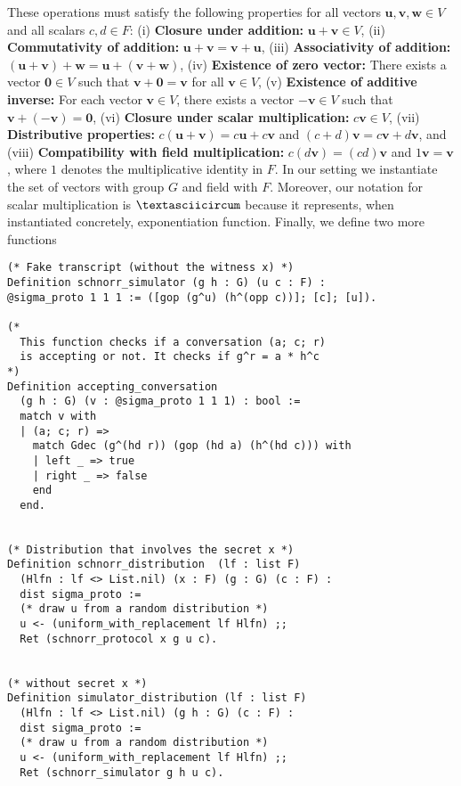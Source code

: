 \documentclass[sigconf]{acmart}
\begin{document}
These operations must satisfy the following properties for all vectors \(\mathbf{u}, \mathbf{v}, \mathbf{w} \in V\) and all scalars \(c, d \in F\):
(i) \textbf{Closure under addition:} \(\mathbf{u} + \mathbf{v} \in V\), (ii) \textbf{Commutativity of addition:} \(\mathbf{u} + \mathbf{v} = \mathbf{v} + \mathbf{u}\), 
(iii)  \textbf{Associativity of addition:} \((\mathbf{u} + \mathbf{v}) + \mathbf{w} = \mathbf{u} + (\mathbf{v} + \mathbf{w})\), 
(iv) \textbf{Existence of zero vector:} There exists a vector \(\mathbf{0} \in V\) such that \(\mathbf{v} + \mathbf{0} = \mathbf{v}\) for all \(\mathbf{v} \in V\), 
(v) \textbf{Existence of additive inverse:} For each vector \(\mathbf{v} \in V\), there exists a vector \(-\mathbf{v} \in V\) such that \(\mathbf{v} + (-\mathbf{v}) = \mathbf{0}\),
(vi) \textbf{Closure under scalar multiplication:} \(c\mathbf{v} \in V\), 
(vii) \textbf{Distributive properties:} \(c(\mathbf{u} + \mathbf{v}) = c\mathbf{u} + c\mathbf{v}\) and \((c + d)\mathbf{v} = c\mathbf{v} + d\mathbf{v}\), 
and (viii) \textbf{Compatibility with field multiplication:} \(c(d\mathbf{v}) = (cd)\mathbf{v}\) and \(1\mathbf{v} = \mathbf{v}\), where \(1\) denotes the multiplicative identity in \(F\).
In our setting we instantiate the set of vectors with group $G$ and field with $F$. Moreover, our notation for scalar multiplication 
is $\textasciicircum$ because it represents, when instantiated concretely, exponentiation function. Finally, 
we define two more functions 

\begin{lstlisting}[language=Coq]
(* Fake transcript (without the witness x) *)
Definition schnorr_simulator (g h : G) (u c : F) : 
@sigma_proto 1 1 1 := ([gop (g^u) (h^(opp c))]; [c]; [u]).

(* 
  This function checks if a conversation (a; c; r) 
  is accepting or not. It checks if g^r = a * h^c
*)
Definition accepting_conversation 
  (g h : G) (v : @sigma_proto 1 1 1) : bool :=
  match v with
  | (a; c; r) =>  
    match Gdec (g^(hd r)) (gop (hd a) (h^(hd c))) with 
    | left _ => true
    | right _ => false 
    end
  end.


(* Distribution that involves the secret x *)
Definition schnorr_distribution  (lf : list F) 
  (Hlfn : lf <> List.nil) (x : F) (g : G) (c : F) : 
  dist sigma_proto :=
  (* draw u from a random distribution *)
  u <- (uniform_with_replacement lf Hlfn) ;;
  Ret (schnorr_protocol x g u c).


(* without secret x *)
Definition simulator_distribution (lf : list F) 
  (Hlfn : lf <> List.nil) (g h : G) (c : F) : 
  dist sigma_proto :=
  (* draw u from a random distribution *)
  u <- (uniform_with_replacement lf Hlfn) ;;
  Ret (schnorr_simulator g h u c).
\end{lstlisting}
\end{document}
